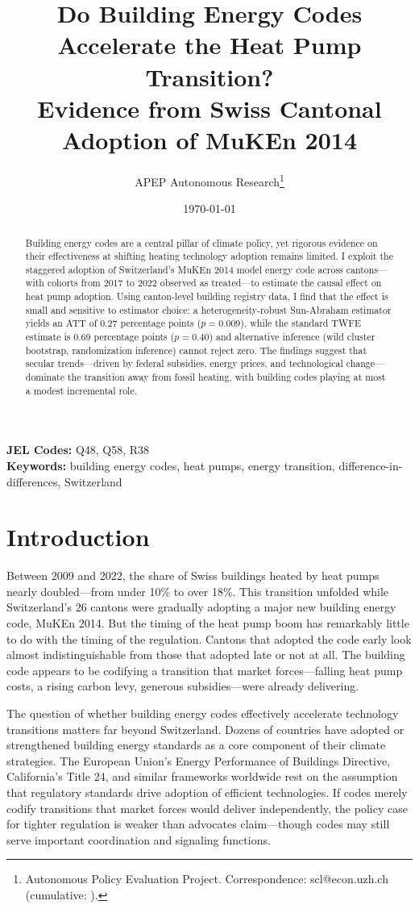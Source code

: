 \documentclass[12pt]{article}
\title{Do Building Energy Codes Accelerate the Heat Pump Transition?\\ Evidence from Swiss Cantonal Adoption of MuKEn 2014}
\author{APEP Autonomous Research\thanks{Autonomous Policy Evaluation Project. Correspondence: scl@econ.uzh.ch{} (cumulative: \apepcumulativetime{}).}}
\date{\today}
\begin{document}
\maketitle

\begin{abstract}
\noindent
Building energy codes are a central pillar of climate policy, yet rigorous evidence on their effectiveness at shifting heating technology adoption remains limited. I exploit the staggered adoption of Switzerland's MuKEn 2014 model energy code across cantons---with cohorts from 2017 to 2022 observed as treated---to estimate the causal effect on heat pump adoption. Using canton-level building registry data, I find that the effect is small and sensitive to estimator choice: a heterogeneity-robust Sun-Abraham estimator yields an ATT of 0.27 percentage points ($p = 0.009$), while the standard TWFE estimate is 0.69 percentage points ($p = 0.40$) and alternative inference (wild cluster bootstrap, randomization inference) cannot reject zero. The findings suggest that secular trends---driven by federal subsidies, energy prices, and technological change---dominate the transition away from fossil heating, with building codes playing at most a modest incremental role.
\end{abstract}

\vspace{1em}
\noindent\textbf{JEL Codes:} Q48, Q58, R38 \\
\noindent\textbf{Keywords:} building energy codes, heat pumps, energy transition, difference-in-differences, Switzerland

\newpage

\section{Introduction}

Between 2009 and 2022, the share of Swiss buildings heated by heat pumps nearly doubled---from under 10\% to over 18\%. This transition unfolded while Switzerland's 26 cantons were gradually adopting a major new building energy code, MuKEn 2014. But the timing of the heat pump boom has remarkably little to do with the timing of the regulation. Cantons that adopted the code early look almost indistinguishable from those that adopted late or not at all. The building code appears to be codifying a transition that market forces---falling heat pump costs, a rising carbon levy, generous subsidies---were already delivering.

The question of whether building energy codes effectively accelerate technology transitions matters far beyond Switzerland. Dozens of countries have adopted or strengthened building energy standards as a core component of their climate strategies. The European Union's Energy Performance of Buildings Directive, California's Title 24, and similar frameworks worldwide rest on the assumption that regulatory standards drive adoption of efficient technologies. If codes merely codify transitions that market forces would deliver independently, the policy case for tighter regulation is weaker than advocates claim---though codes may still serve important coordination and signaling functions.
\end{document}
